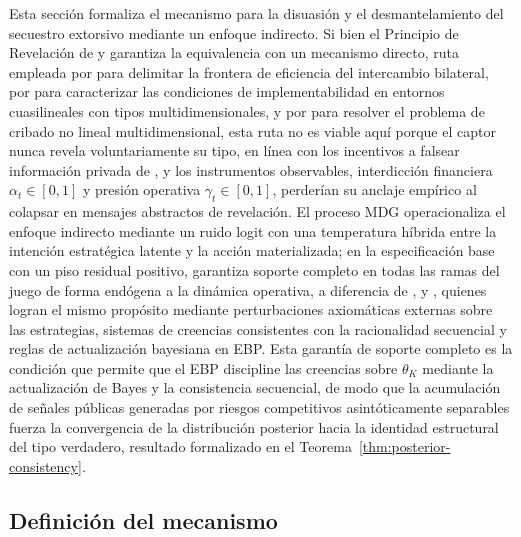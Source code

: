 \documentclass[review,authoryear,12pt]{elsarticle}
\theoremstyle{plain}
\theoremstyle{definition}
\newcommand{\1}{\mathbf{1}}
\begin{document}
Esta sección formaliza el mecanismo para la disuasión y el desmantelamiento del secuestro extorsivo mediante un enfoque indirecto. Si bien el Principio de Revelación de \citet{Gibbard1973} y \citet{Myerson1979IC,Myerson1981} garantiza la equivalencia con un mecanismo directo, ruta empleada por \citet{MyersonSatterthwaite1983} para delimitar la frontera de eficiencia del intercambio bilateral, por \citet{Rochet1987} para caracterizar las condiciones de implementabilidad en entornos cuasilineales con tipos multidimensionales, y por \citet{RochetChone1998} para resolver el problema de cribado no lineal multidimensional, esta ruta no es viable aquí porque el captor nunca revela voluntariamente su tipo, en línea con los incentivos a falsear información privada de \citet{Fearon1995Rationalist}, y los instrumentos observables, interdicción financiera $\alpha_t\in[0,1]$ y presión operativa $\gamma_t\in[0,1]$, perderían su anclaje empírico al colapsar en mensajes abstractos de revelación. El proceso MDG operacionaliza el enfoque indirecto mediante un ruido logit con una temperatura híbrida entre la intención estratégica latente y la acción materializada; en la especificación base con un piso residual positivo, garantiza soporte completo en todas las ramas del juego de forma endógena a la dinámica operativa, a diferencia de \citet{Selten1975Perfectness}, \citet{KrepsWilson1982} y \citet{FudenbergTirole1991}, quienes logran el mismo propósito mediante perturbaciones axiomáticas externas sobre las estrategias, sistemas de creencias consistentes con la racionalidad secuencial y reglas de actualización bayesiana en EBP. Esta garantía de soporte completo es la condición que permite que el EBP discipline las creencias sobre $\theta_K$ mediante la actualización de Bayes y la consistencia secuencial, de modo que la acumulación de señales públicas generadas por riesgos competitivos asintóticamente separables fuerza la convergencia de la distribución posterior hacia la identidad estructural del tipo verdadero, resultado formalizado en el Teorema~\ref{thm:posterior-consistency}.

\subsection{Definición del mecanismo}\label{subsec:def-mecanismo}
\end{document}
